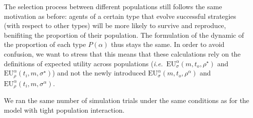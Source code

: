 \documentclass[a4paper]{article}
\begin{document}
The selection process between different populations still follows the same motivation as before: agents of a certain type that evolve successful strategies (with respect to other types) will be more likely to survive and reproduce, benifiting the proportion of their population.
The formulation of the dynamic of the proportion of each type $P(\alpha)$ thus stays the same.
In order to avoid confusion, we want to stress that this means that these calculations rely on the definitions of expected utility across populations (\emph{i.e.}~$\text{EU}_{\sigma}^{\alpha}(m,t_{o},\rho^{\star})$ and $\text{EU}_{\rho}^{\alpha}(t_{i},m,\sigma^{\star})$) and not the newly introduced $\text{EU}_{\sigma}^{\alpha}(m,t_{o},\rho^{\alpha})$ and $\text{EU}_{\rho}^{\alpha}(t_{i},m,\sigma^{\alpha})$.

We ran the same number of simulation trials under the same conditions as for the model with tight population interaction.
\end{document}
